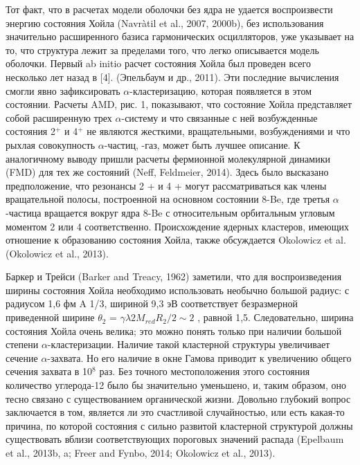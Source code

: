 \documentclass[fontsize=14pt]{scrarticle}
\begin{document}
Тот факт, что в расчетах модели оболочки без ядра не удается воспроизвести энергию состояния Хойла (Navr\`{a}til et al., 2007, 2000b), без использования значительно расширенного базиса гармонических осцилляторов, уже указывает на то, что структура лежит за пределами того, что легко описывается модель оболочки. Первый ab initio расчет состояния Хойла был проведен всего несколько лет назад в [4]. (Эпельбаум и др., 2011). Эти последние вычисления смогли явно зафиксировать $\alpha$-кластеризацию, которая появляется в этом состоянии. Расчеты AMD, рис. 1, показывают, что состояние Хойла представляет собой расширенную трех $\alpha$-систему и что связанные с ней возбужденные состояния 2$^{+}$ и 4$^{+}$ не являются жесткими, вращательными, возбуждениями и что рыхлая совокупность $\alpha$-частиц, -газ, может быть лучшее описание. К аналогичному выводу пришли расчеты фермионной молекулярной динамики (FMD) для тех же состояний (Neff, Feldmeier, 2014). Здесь было высказано предположение, что резонансы 2 + и 4 + могут рассматриваться как члены вращательной полосы, построенной на основном состоянии 8-Be, где третья $\alpha$-частица вращается вокруг ядра 8-Be с относительным орбитальным угловым моментом 2 или 4 соответственно. Происхождение ядерных кластеров, имеющих отношение к образованию состояния Хойла, также обсуждается Okolowicz et al. (Okolowicz et al., 2013).

Баркер и Трейси (Barker and Treacy, 1962) заметили, что для воспроизведения ширины состояния Хойла необходимо использовать необычно большой радиус: с радиусом 1,6 фм A 1/3, шириной 9,3 эВ соответствует безразмерной приведенной ширине $\theta_{2}$ = $\gamma\lambda 2 M_{red}R_{2}/2\sim 2$ , равной 1,5. Следовательно, ширина состояния Хойла очень велика; это можно понять только при наличии большой степени $\alpha$-кластеризации. Наличие такой кластерной структуры увеличивает сечение $\alpha$-захвата. Но его наличие в окне Гамова приводит к увеличению общего сечения захвата в 10$^{8}$ раз. Без точного местоположения этого состояния количество углерода-12 было бы значительно уменьшено, и, таким образом, оно тесно связано с существованием органической жизни. Довольно глубокий вопрос заключается в том, является ли это счастливой случайностью, или есть какая-то причина, по которой состояния с сильно развитой кластерной структурой должны существовать вблизи соответствующих пороговых значений распада (Epelbaum et al., 2013b, a; Freer and Fynbo, 2014; Okolowicz et al., 2013).
\end{document}
